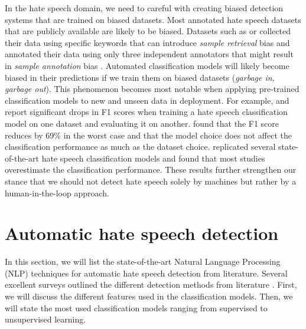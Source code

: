 %
In the hate speech domain, we need to careful with creating biased detection systems that are trained on biased datasets.
%
Most annotated hate speech datasets that are publicly available are likely to be biased.
%
%
Datasets such as \citet{waseem2016hateful} or \citet{basile2019semeval} collected their data using specific keywords that can introduce \textit{sample retrieval} bias and annotated their data using only three independent annotators that might result in \textit{sample annotation} bias \citep{balayn2021automatic}.
%
Automated classification models will likely become biased in their predictions if we train them on biased datasets (\emph{garbage in, garbage out}).
%
This phenomenon becomes most notable when applying pre-trained classification models to new and unseen data in deployment.
%
For example, \citet{grondahl2018all} and \citet{arango2019hate} report significant drops in F1 scores when training a hate speech classification model on one dataset and evaluating it on another.
%
\citet{grondahl2018all} found that the F1 score reduces by 69\% in the worst case and that the model choice does not affect the classification performance as much as the dataset choice.
%
\citet{arango2019hate} replicated several state-of-the-art hate speech classification models and found that most studies overestimate the classification performance.
%
These results further strengthen our stance that we should not detect hate speech solely by machines but rather by a human-in-the-loop approach.

\section{Automatic hate speech detection}
\label{sec:related-work-detection-algorithms}
%
In this section, we will list the state-of-the-art Natural Language Processing (NLP) techniques for automatic hate speech detection from literature.
%
Several excellent surveys outlined the different detection methods from literature  \citep{fortuna2018survey, schmidt2019survey}.
%
First, we will discuss the different features used in the classification models.
%
Then, we will state the most used classification models ranging from supervised to unsupervised learning.
%

